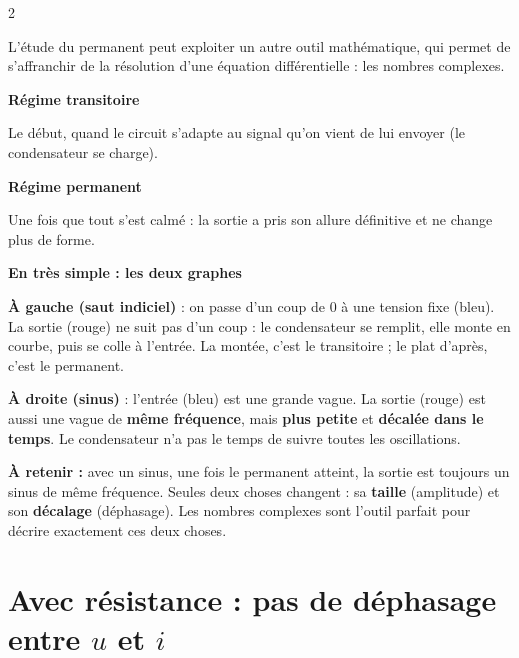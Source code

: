 \documentclass[a4paper,9pt]{extarticle}
\begin{document}
\begin{multicols}{2}
\begin{itemize}
\end{itemize}

L'étude du permanent peut exploiter un autre outil mathématique, qui permet de s'affranchir de la résolution d'une équation différentielle : les nombres complexes.


\begin{definition}

\textbf{Régime transitoire}

Le début, quand le circuit \og s'adapte \fg{} au signal qu'on vient de lui envoyer (le condensateur se charge).

\textbf{Régime permanent}

Une fois que tout s'est calmé : la sortie a pris son allure définitive et ne change plus de forme.

\end{definition}


\begin{important}

\textbf{En très simple : les deux graphes}

\textbf{À gauche (saut indiciel)} : on passe d'un coup de $0$ à une tension fixe (bleu). La sortie (rouge) ne suit pas d'un coup : le condensateur se remplit, elle monte en courbe, puis se colle à l'entrée. La montée, c'est le transitoire ; le plat d'après, c'est le permanent.

\vspace{3pt}

\textbf{À droite (sinus)} : l'entrée (bleu) est une grande vague. La sortie (rouge) est aussi une vague de \textbf{même fréquence}, mais \textbf{plus petite} et \textbf{décalée dans le temps}. Le condensateur n'a pas le temps de suivre toutes les oscillations.

\vspace{3pt}

\textbf{À retenir :} avec un sinus, une fois le permanent atteint, la sortie est toujours un sinus de même fréquence. Seules deux choses changent : sa \textbf{taille} (amplitude) et son \textbf{décalage} (déphasage). Les nombres complexes sont l'outil parfait pour décrire exactement ces deux choses.

\end{important}


\section{Avec résistance : pas de déphasage entre $u$ et $i$}



\end{multicols}
\end{document}
